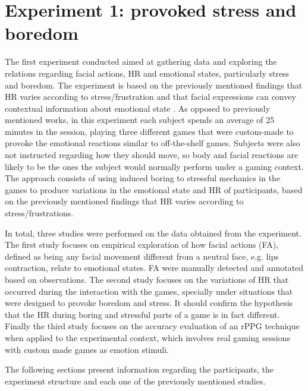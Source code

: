 \chapter{Experiment 1: provoked stress and boredom}

The first experiment conducted aimed at gathering data and exploring the relations regarding facial actions, HR and emotional states, particularly stress and boredom. The experiment is based on the previously mentioned findings that HR varies according to stress/frustration and that facial expressions can convey contextual information about emotional state \parencite{giannakakis2017stress}. As opposed to previously mentioned works, in this experiment each subject spends an average of 25 minutes in the session, playing three different games that were custom-made to provoke the emotional reactions similar to off-the-shelf games. Subjects were also not instructed regarding how they should move, so body and facial reactions are likely to be the ones the subject would normally perform under a gaming context. The approach consists of using induced boring to stressful mechanics in the games to produce variations in the emotional state and HR of participants, based on the previously mentioned findings that HR varies according to stress/frustrations.

In total, three studies were performed on the data obtained from the experiment. The first study focuses on empirical exploration of how facial actions (FA), defined as being any facial movement different from a neutral face, e.g. lips contraction, relate to emotional states. FA were manually detected and annotated based on observations. The second study focuses on the variations of HR that occurred during the interaction with the games, specially under situations that were designed to provoke boredom and stress. It should confirm the hypothesis that the HR during boring and stressful parts of a game is in fact different. Finally the third study focuses on the accuracy evaluation of an rPPG technique when applied to the experimental context, which involves real gaming sessions with custom made games as emotion stimuli.

The following sections present information regarding the participants, the experiment structure and each one of the previously mentioned studies.


